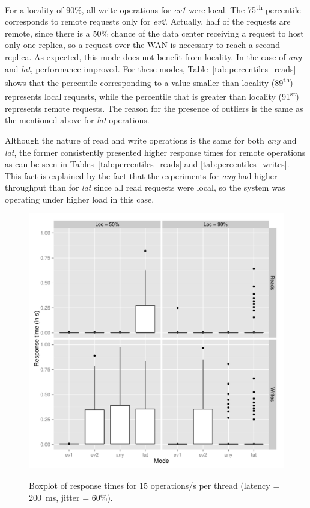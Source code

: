 \documentclass[man,floatsintext,12pt]{apa6}
\begin{document}
For a locality of 90\%, all write operations for \textit{ev1} were local.  The
75\textsuperscript{th} percentile corresponds to remote requests only for
\textit{ev2}.  Actually, half of the requests are remote, since there is a 50\%
chance of the data center receiving a request to host only one replica, so a
request over the WAN is necessary to reach a second replica. As expected, this
mode does not benefit from locality. In the case of \textit{any} and
\textit{lat}, performance improved. For these modes,
Table~\ref{tab:percentiles_reads} shows that the percentile corresponding to a
value smaller than locality (89\textsuperscript{th}) represents local requests,
while the percentile that is greater than locality (91\textsuperscript{st})
represents remote requests. The reason for the presence of outliers is the same
as the mentioned above for \textit{lat} operations.

Although the nature of read and write operations is the same for both
\textit{any} and \textit{lat}, the former consistently presented higher
response times for remote operations as can be seen in
Tables~\ref{tab:percentiles_reads} and \ref{tab:percentiles_writes}. This fact
is explained by the fact that the experiments for \textit{any} had higher
throughput than for \textit{lat} since all read requests were local, so the
system was operating under higher load in this case.

\begin{figure}[h!]
\caption{Boxplot of response times for 15 operations/s per thread (latency = 200~ms, jitter = 60\%).}
\includegraphics[width=1.0\textwidth]{boxplot200.png}
\label{fig:boxplot_response_times}
\end{figure}
\end{document}
